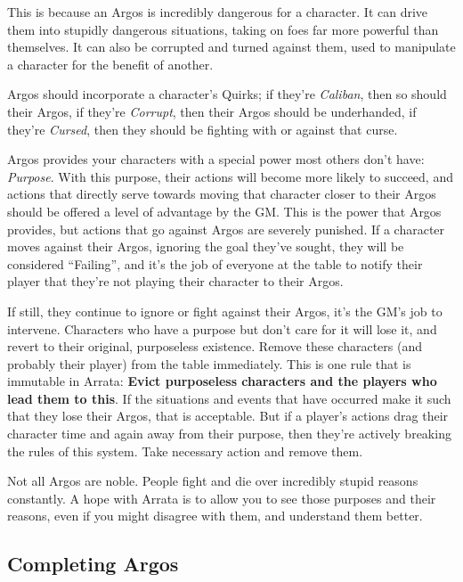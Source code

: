 \documentclass[../main.tex]{subfiles}
\begin{document}
        This is because an Argos is incredibly dangerous for a character. It can drive them into stupidly dangerous situations, taking on foes far more powerful than themselves. It can also be corrupted and turned against them, used to manipulate a character for the benefit of another.

        Argos should incorporate a character's Quirks; if they're \emph{Caliban}, then so should their Argos, if they're \emph{Corrupt}, then their Argos should be underhanded, if they're \emph{Cursed}, then they should be fighting with or against that curse.

        Argos provides your characters with a special power most others don't have: \emph{Purpose}. With this purpose, their actions will become more likely to succeed, and actions that directly serve towards moving that character closer to their Argos should be offered a level of advantage by the GM. This is the power that Argos provides, but actions that go against Argos are severely punished. If a character moves against their Argos, ignoring the goal they've sought, they will be considered ``Failing'', and it's the job of everyone at the table to notify their player that they're not playing their character to their Argos.

        If still, they continue to ignore or fight against their Argos, it's the GM's job to intervene. Characters who have a purpose but don't care for it will lose it, and revert to their original, purposeless existence. Remove these characters (and probably their player) from the table immediately. This is one rule that is immutable in Arrata: \textbf{Evict purposeless characters and the players who lead them to this}. If the situations and events that have occurred make it such that they lose their Argos, that is acceptable. But if a player's actions drag their character time and again away from their purpose, then they're actively breaking the rules of this system. Take necessary action and remove them.

        Not all Argos are noble. People fight and die over incredibly stupid reasons constantly. A hope with Arrata is to allow you to see those purposes and their reasons, even if you might disagree with them, and understand them better.

    \subsection{Completing Argos}
\end{document}
